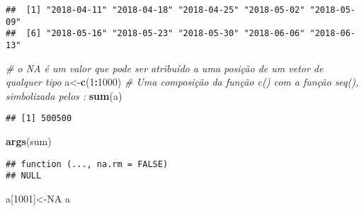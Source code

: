 \documentclass[]{article}
\newenvironment{Shaded}{\begin{snugshade}}{\end{snugshade}}
\newcommand{\KeywordTok}[1]{\textcolor[rgb]{0.13,0.29,0.53}{\textbf{#1}}}
\newcommand{\DecValTok}[1]{\textcolor[rgb]{0.00,0.00,0.81}{#1}}
\newcommand{\CommentTok}[1]{\textcolor[rgb]{0.56,0.35,0.01}{\textit{#1}}}
\newcommand{\OtherTok}[1]{\textcolor[rgb]{0.56,0.35,0.01}{#1}}
\newcommand{\OperatorTok}[1]{\textcolor[rgb]{0.81,0.36,0.00}{\textbf{#1}}}
\newcommand{\NormalTok}[1]{#1}
\begin{document}
\begin{verbatim}
##  [1] "2018-04-11" "2018-04-18" "2018-04-25" "2018-05-02" "2018-05-09"
##  [6] "2018-05-16" "2018-05-23" "2018-05-30" "2018-06-06" "2018-06-13"
\end{verbatim}

\begin{Shaded}
\begin{Highlighting}[]
\CommentTok{# o NA é um valor que pode ser atribuído a uma posição de um vetor de qualquer tipo}
\NormalTok{a<-}\KeywordTok{c}\NormalTok{(}\DecValTok{1}\OperatorTok{:}\DecValTok{1000}\NormalTok{) }\CommentTok{# Uma composição da função c() com a função seq(), simbolizada pelos :}
\KeywordTok{sum}\NormalTok{(a)}
\end{Highlighting}
\end{Shaded}

\begin{verbatim}
## [1] 500500
\end{verbatim}

\begin{Shaded}
\begin{Highlighting}[]
\KeywordTok{args}\NormalTok{(sum)}
\end{Highlighting}
\end{Shaded}

\begin{verbatim}
## function (..., na.rm = FALSE) 
## NULL
\end{verbatim}

\begin{Shaded}
\begin{Highlighting}[]
\NormalTok{a[}\DecValTok{1001}\NormalTok{]<-}\OtherTok{NA}
\NormalTok{a}
\end{Highlighting}
\end{Shaded}
\end{document}
